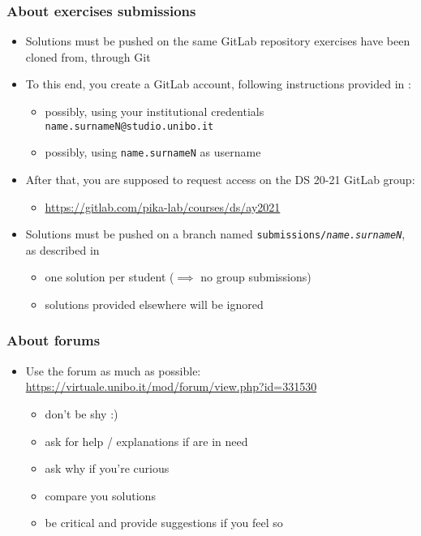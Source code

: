 \documentclass[handout]{beamer}\mode<presentation>{\usetheme{AMSCesenaPurpleAndGold}}
\begin{document}
\begin{frame}%
    \frametitle{About exercises submissions}

    \begin{itemize}
        \item Solutions must be pushed on the same GitLab repository exercises have been cloned from, \alert{through Git}

        \vfill

        \item To this end, you create a GitLab account, following instructions provided in :
        \begin{itemize}
            \item possibly, using your institutional credentials \texttt{\alert{name.surnameN}@studio.unibo.it}
            \item possibly, using \texttt{\alert{name.surnameN}} as username
        \end{itemize}

        \vfill

        \item After that, you are supposed to request access on the DS 20-21 GitLab group:
        \begin{itemize}
            \item \url{https://gitlab.com/pika-lab/courses/ds/ay2021}
        \end{itemize}

        \vfill

        \item Solutions must be pushed on a branch named \alert{\texttt{submissions/\textit{name.surnameN}}}, as described in 
        \begin{itemize}
            \item one solution per student ($\implies$ no group submissions)
            \item solutions provided elsewhere will be ignored
        \end{itemize}
    \end{itemize}
\end{frame}

\begin{frame}%
\frametitle{About forums}
    \begin{itemize}
        \item Use the forum as much as possible: \url{https://virtuale.unibo.it/mod/forum/view.php?id=331530}
        \begin{itemize}
            \item don't be shy :)
            \item ask for help / explanations if are in need
            \item ask why if you're curious
            \item compare you solutions
            \item be critical and provide suggestions if you feel so
        \end{itemize}
    \end{itemize}
\end{frame}
\end{document}
